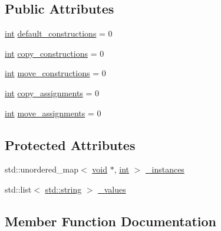 \subsection*{Public Attributes}
\begin{DoxyCompactItemize}
\item 
\mbox{\hyperlink{warnings_8h_a74f207b5aa4ba51c3a2ad59b219a423b}{int}} \mbox{\hyperlink{class_constructor_stats_a4f55756626d79cd593b2a4175a418c8e}{default\+\_\+constructions}} = 0
\item 
\mbox{\hyperlink{warnings_8h_a74f207b5aa4ba51c3a2ad59b219a423b}{int}} \mbox{\hyperlink{class_constructor_stats_aa88c86bf175f2d5c17ed5cfd70b63322}{copy\+\_\+constructions}} = 0
\item 
\mbox{\hyperlink{warnings_8h_a74f207b5aa4ba51c3a2ad59b219a423b}{int}} \mbox{\hyperlink{class_constructor_stats_a4cb950657607ee9e98510af80fe1de34}{move\+\_\+constructions}} = 0
\item 
\mbox{\hyperlink{warnings_8h_a74f207b5aa4ba51c3a2ad59b219a423b}{int}} \mbox{\hyperlink{class_constructor_stats_a726f3ab53cffbfac3bc6b4c85a922685}{copy\+\_\+assignments}} = 0
\item 
\mbox{\hyperlink{warnings_8h_a74f207b5aa4ba51c3a2ad59b219a423b}{int}} \mbox{\hyperlink{class_constructor_stats_ac379fa5d680babb293ac6a50952046db}{move\+\_\+assignments}} = 0
\end{DoxyCompactItemize}
\subsection*{Protected Attributes}
\begin{DoxyCompactItemize}
\item 
std\+::unordered\+\_\+map$<$ \mbox{\hyperlink{_s_d_l__opengles2__gl2ext_8h_ae5d8fa23ad07c48bb609509eae494c95}{void}} $\ast$, \mbox{\hyperlink{warnings_8h_a74f207b5aa4ba51c3a2ad59b219a423b}{int}} $>$ \mbox{\hyperlink{class_constructor_stats_ac1a574faa15251d5fd56a5f57d23e662}{\+\_\+instances}}
\item 
std\+::list$<$ \mbox{\hyperlink{_s_d_l__opengl__glext_8h_ab4ccfaa8ab0e1afaae94dc96ef52dde1}{std\+::string}} $>$ \mbox{\hyperlink{class_constructor_stats_a1b6391e5ac7f579d050bb15a222b2325}{\+\_\+values}}
\end{DoxyCompactItemize}


\subsection{Member Function Documentation}
\mbox{\label{class_constructor_stats_a376fdb0d0e0c053aacd1077d0c85c88f}} 
